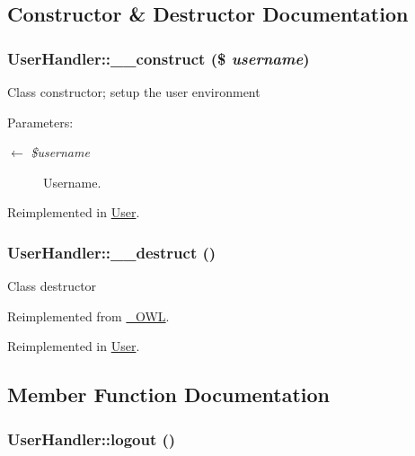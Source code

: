 \subsection{Constructor \& Destructor Documentation}
\hypertarget{classUserHandler_624054e9693139a3fe5af0ef3b757f04}{
\subsubsection{\setlength{\rightskip}{0pt plus 5cm}UserHandler::\_\-\_\-construct (\$ {\em username})}}
\label{classUserHandler_624054e9693139a3fe5af0ef3b757f04}


Class constructor; setup the user environment

\begin{Desc}
\item[Parameters:]
\begin{description}
\item[\mbox{$\leftarrow$} {\em \$username}]Username. \end{description}
\end{Desc}


Reimplemented in \hyperlink{classUser_16b171e344993f5d4c3aa8cddcfc8050}{User}.\hypertarget{classUserHandler_3e1f6381ed79caf6e1a255fb0a9cc386}{
\subsubsection{\setlength{\rightskip}{0pt plus 5cm}UserHandler::\_\-\_\-destruct ()}}
\label{classUserHandler_3e1f6381ed79caf6e1a255fb0a9cc386}


Class destructor 

Reimplemented from \hyperlink{class__OWL_44fd2222476a3109286cc82d92b6bbcc}{\_\-OWL}.

Reimplemented in \hyperlink{classUser_ccd20149a7414612c1505e022eb63ffc}{User}.

\subsection{Member Function Documentation}
\hypertarget{classUserHandler_8000feaceda9d3c37fc56b6d1969b8f7}{
\subsubsection{\setlength{\rightskip}{0pt plus 5cm}UserHandler::logout ()}}
\label{classUserHandler_8000feaceda9d3c37fc56b6d1969b8f7}


